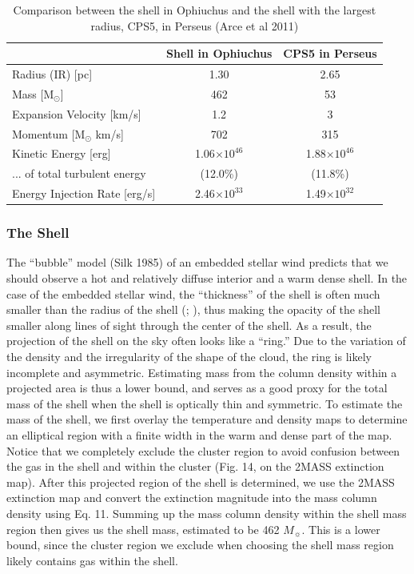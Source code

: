 \documentclass[11pt,a4paper]{emulateapj}
\begin{document}
\begin{table}[ht]
\centering
\begin{tabular}{lcc}
\hline
& \textbf{Shell in Ophiuchus} & \textbf{CPS5 in Perseus} \\   
\hline
Radius (IR) [pc] & 1.30 & 2.65 \\ 
Mass [M$_{\odot}$] & 462 & 53 \\ 
Expansion Velocity [km/s] & 1.2 & 3 \\ 
Momentum [M$_{\odot}$ km/s]& 702 & 315 \\ 
Kinetic Energy [erg]& 1.06$\times10^{46}$ & 1.88$\times10^{46}$ \\ 
... of total turbulent energy & (12.0\%) & (11.8\%) \\ 
Energy Injection Rate [erg/s] & 2.46$\times10^{33}$ & 1.49$\times10^{32}$ \\
\hline
\end{tabular}
\caption{Comparison between the shell in Ophiuchus and the shell with the largest radius, CPS5, in Perseus (Arce et al 2011)}
\end{table}

\subsubsection{The Shell}
The ``bubble'' model (Silk 1985) of an embedded stellar wind predicts that we should observe a hot and relatively diffuse interior and a warm dense shell. In the case of the embedded stellar wind, the ``thickness'' of the shell is often much smaller than the radius of the shell (\citet{Churchwell_2007}; \citet{Arce_2011}), thus making the opacity of the shell smaller along lines of sight through the center of the shell. As a result, the projection of the shell on the sky often looks like a ``ring.'' Due to the variation of the density and the irregularity of the shape of the cloud, the ring is likely incomplete and asymmetric. Estimating mass from the column density within a projected area is thus a lower bound, and serves as a good proxy for the total mass of the shell when the shell is optically thin and symmetric. To estimate the mass of the shell, we first overlay the temperature and density maps to determine an elliptical region with a finite width in the warm and dense part of the map. Notice that we completely exclude the cluster region to avoid confusion between the gas in the shell and within the cluster (Fig. 14, on the 2MASS extinction map). After this projected region of the shell is determined, we use the 2MASS extinction map and convert the extinction magnitude into the mass column density using Eq. 11. Summing up the mass column density within the shell mass region then gives us the shell mass, estimated to be 462 $M_{\sun}$. This is a lower bound, since the cluster region we exclude when choosing the shell mass region likely contains gas within the shell.
\end{document}
